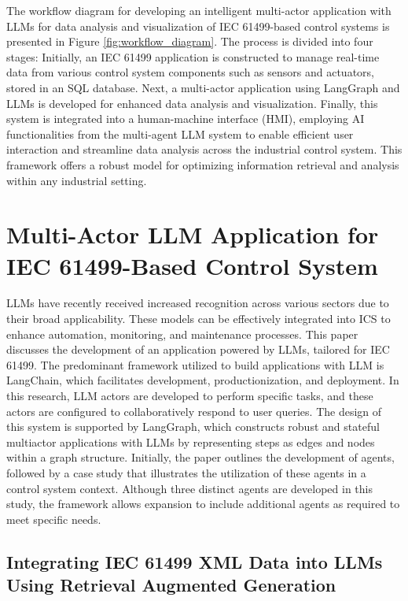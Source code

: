 \begin{bibunit}
The workflow diagram for developing an intelligent multi-actor application with LLMs for data analysis and visualization of IEC 61499-based control systems is presented in Figure \ref{fig:workflow_diagram}. The process is divided into four stages: Initially, an IEC 61499 application is constructed to manage real-time data from various control system components such as sensors and actuators, stored in an SQL database. Next, a multi-actor application using LangGraph and LLMs is developed for enhanced data analysis and visualization. Finally, this system is integrated into a human-machine interface (HMI), employing AI functionalities from the multi-agent LLM system to enable efficient user interaction and streamline data analysis across the industrial control system. This framework offers a robust model for optimizing information retrieval and analysis within any industrial setting.


\section{ Multi-Actor LLM Application for IEC 61499-Based Control System}
\label{sec:methodology}

LLMs have recently received increased recognition across various sectors due to their broad applicability. These models can be effectively integrated into ICS to enhance automation, monitoring, and maintenance processes. This paper discusses the development of an application powered by LLMs, tailored for IEC 61499. The predominant framework utilized to build applications with LLM is LangChain, which facilitates development, productionization, and deployment. In this research, LLM actors are developed to perform specific tasks, and these actors are configured to collaboratively respond to user queries. The design of this system is supported by LangGraph, which constructs robust and stateful multiactor applications with LLMs by representing steps as edges and nodes within a graph structure. Initially, the paper outlines the development of agents, followed by a case study that illustrates the utilization of these agents in a control system context. Although three distinct agents are developed in this study, the framework allows expansion to include additional agents as required to meet specific needs.

\subsection{Integrating IEC 61499 XML Data into LLMs Using Retrieval Augmented Generation}


\end{bibunit}
